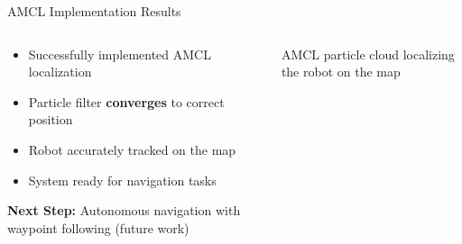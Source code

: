 \documentclass[10pt]{beamer}
\begin{document}
\begin{frame}{AMCL Implementation Results}
\begin{columns}
\begin{column}{0.5\textwidth}
\begin{itemize}
    \item Successfully implemented AMCL localization
    \item Particle filter \textbf{converges} to correct position
    \item Robot accurately tracked on the map
    \item System ready for navigation tasks
\end{itemize}

\vspace{3mm}
\textbf{Next Step:} Autonomous navigation with waypoint following (future work)
\end{column}
\begin{column}{0.48\textwidth}
\centering
{}

\vspace{1mm}
{\tiny AMCL particle cloud localizing the robot on the map}
\end{column}
\end{columns}
\end{frame}
\end{document}

